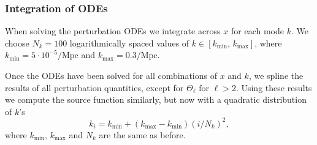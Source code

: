 \subsubsection{Integration of ODEs} \label{sssec:M3:implementations:integration_details}

When solving the perturbation ODEs we integrate across $x$ for each mode $k$. We choose $N_k=100$ logarithmically spaced values of $k\in[k_\mathrm{min},\,k_\mathrm{max}]$, where $k_\mathrm{min}=5\cdot10^{-5}/\mathrm{Mpc}$ and $k_\mathrm{max}=0.3/\mathrm{Mpc}$. 

Once the ODEs have been solved for all combinations of $x$ and $k$, we spline the results of all perturbation quantities, except for $\Theta_\ell$ for $\ell>2$. Using these results we compute the source function similarly, but now with a quadratic distribution of $k$'s  
\begin{equation} \label{eq:M3:implementations:k_distribution_for_source_function}
    k_i = k_\mathrm{min} + (k_\mathrm{max} - k_\mathrm{min})(i/N_k)^2,
\end{equation}
where $k_\mathrm{min},\,k_\mathrm{max}$ and $N_k$ are the same as before.
